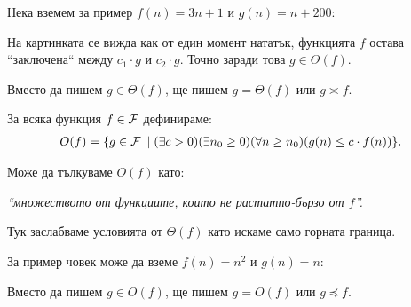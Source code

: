 Нека вземем за пример $f(n) = 3n + 1$ и $g(n) = n + 200$:


На картинката се вижда как от един момент нататък, функцията $f$ остава ``заключена`` между $c_1 \cdot g$ и $c_2 \cdot g$.
Точно заради това $g \in \Theta(f)$.
\begin{remark}
  Вместо да пишем $g \in \Theta(f)$, ще пишем $g = \Theta(f)$ или $g \asymp f$.
\end{remark}

\newpage

\begin{definition}
  За всяка функция $f \in \mathcal{F}$ дефинираме:
  \begin{align*}
    O(f) = \{ g \in \mathcal{F} \: \mid (\exists c > 0)(\exists n_0 \geq 0)(\forall n \geq n_0)(g(n) \leq c \cdot f(n))\}.
  \end{align*}
\end{definition}
Може да тълкуваме $O(f)$ като:
\begin{center}
  \textit{``множеството от функциите, които не растат\footnotemark[1] по-бързо от $f$''.}
\end{center}


Тук заслабваме условията от $\Theta(f)$ като искаме само горната граница.

За пример човек може да вземе $f(n) = n^2$ и $g(n) = n$:


\begin{remark}
  Вместо да пишем $g \in O(f)$, ще пишем $g = O(f)$ или $g \preceq f$.
\end{remark}

